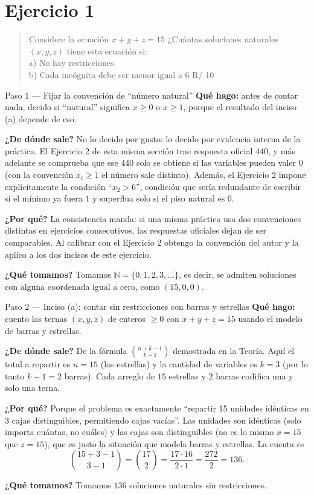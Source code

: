 \documentclass[11pt]{article}
\begin{document}
\section*{Ejercicio 1}

\begin{quote}
Considere la ecuación $x+y+z=15$ ¿Cuántas soluciones naturales $(x,y,z)$ tiene esta ecuación si:\\
a) No hay restricciones.\\
b) Cada incógnita debe ser menor igual a 6 \hfill R/ 10
\end{quote}

\begin{paso}{Paso 1 --- Fijar la convención de ``número natural''}
\textbf{Qué hago:} antes de contar nada, decido si ``natural'' significa $x\ge 0$ o $x\ge 1$, porque
el resultado del inciso (a) depende de eso.

\textbf{¿De dónde sale?} No lo decido por gusto: lo decido por evidencia interna de la práctica. El
Ejercicio 2 de esta misma sección trae respuesta oficial $440$, y más adelante se comprueba que ese
$440$ solo se obtiene si las variables pueden valer $0$ (con la convención $x_i\ge 1$ el número sale
distinto). Además, el Ejercicio 2 impone explícitamente la condición ``$x_2>6$'', condición que sería
redundante de escribir si el mínimo ya fuera $1$ y superflua solo si el piso natural es $0$.

\textbf{¿Por qué?} La consistencia manda: si una misma práctica usa dos convenciones distintas en
ejercicios consecutivos, las respuestas oficiales dejan de ser comparables. Al calibrar con el
Ejercicio 2 obtengo la convención del autor y la aplico a los dos incisos de este ejercicio.

\textbf{¿Qué tomamos?} Tomamos $\mathbb{N}=\{0,1,2,3,\dots\}$, es decir, se admiten soluciones con
alguna coordenada igual a cero, como $(15,0,0)$.
\end{paso}

\begin{paso}{Paso 2 --- Inciso (a): contar sin restricciones con barras y estrellas}
\textbf{Qué hago:} cuento las ternas $(x,y,z)$ de enteros $\ge 0$ con $x+y+z=15$ usando el modelo de
barras y estrellas.

\textbf{¿De dónde sale?} De la fórmula $\binom{n+k-1}{k-1}$ demostrada en la Teoría. Aquí el total a
repartir es $n=15$ (las estrellas) y la cantidad de variables es $k=3$ (por lo tanto $k-1=2$ barras).
Cada arreglo de $15$ estrellas y $2$ barras codifica una y solo una terna.

\textbf{¿Por qué?} Porque el problema es exactamente ``repartir 15 unidades idénticas en 3 cajas
distinguibles, permitiendo cajas vacías''. Las unidades son idénticas (solo importa cuántas, no
cuáles) y las cajas son distinguibles (no es lo mismo $x=15$ que $z=15$), que es justo la situación
que modela barras y estrellas. La cuenta es
\[
\binom{15+3-1}{3-1}=\binom{17}{2}=\frac{17\cdot 16}{2\cdot 1}=\frac{272}{2}=136.
\]

\textbf{¿Qué tomamos?} Tomamos $136$ soluciones naturales sin restricciones.
\end{paso}
\end{document}
